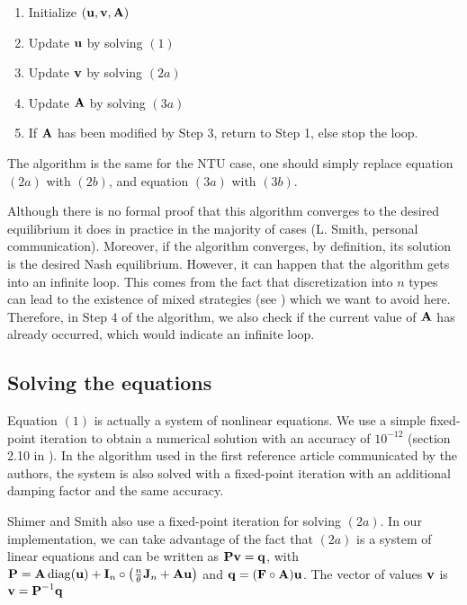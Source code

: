 \begin{enumerate}[start=0]
	\item Initialize $(\boldsymbol{\mathbf{u}},\boldsymbol{\mathbf{v}},\boldsymbol{\mathbf{A}})$
	\item Update $\boldsymbol{\mathbf{u}}$ by solving $(1)$
	\item Update $\boldsymbol{\mathbf{v}}$ by solving $(2a)$
	\item Update $\boldsymbol{\mathbf{A}}$ by solving $(3a)$
	\item If $\boldsymbol{\mathbf{A}}$ has been modified by Step 3, return to Step 1, else stop the loop.
\end{enumerate}

The algorithm is the same for the NTU case, one should simply replace equation $(2a)$ with $(2b)$, and equation $(3a)$ with $(3b)$.

Although there is no formal proof that this algorithm converges to the desired equilibrium it does in practice in the majority of cases (L. Smith, personal communication). Moreover, if the algorithm converges, by definition, its solution is the desired Nash equilibrium. However, it can happen that the algorithm gets into an infinite loop. This comes from the fact that discretization into $n$ types can lead to the existence of mixed strategies (see \citep{hagedorn_identifying_2017}) which we want to avoid here. Therefore, in Step 4 of the algorithm, we also check if the current value of $\boldsymbol{\mathbf{A}}$ has already occurred, which would indicate an infinite loop. 


\subsection*{Solving the equations}

Equation $(1)$ is actually a system of nonlinear equations. We use a simple fixed-point iteration to obtain a numerical solution with an accuracy of $10^{-12}$ (section 2.10 in \citep{atkinson_introduction_1989}). In the algorithm used in the first reference article \citep{shimer_assortative_2000} communicated by the authors, the system is also solved with a fixed-point iteration with an additional damping factor and the same accuracy.

Shimer and Smith \citep{shimer_assortative_2000} also use a fixed-point iteration for solving $(2a)$. In our implementation, we can take advantage of the fact that $(2a)$ is a system of linear equations and can be written as $\boldsymbol{\mathbf{P}} \boldsymbol{\mathbf{v}} = \boldsymbol{\mathbf{q}}$, with $\boldsymbol{\mathbf{P}} = \boldsymbol{\mathbf{A}} \operatorname{diag}(\boldsymbol{\mathbf{u}}) + \boldsymbol{\mathbf{I}}_n \circ \left(\frac{n}{\theta} \boldsymbol{\mathbf{J}}_n + \boldsymbol{\mathbf{A}} \boldsymbol{\mathbf{u}}\right)$ and $\boldsymbol{\mathbf{q}} = (\boldsymbol{\mathbf{F}} \circ \boldsymbol{\mathbf{A}}) \boldsymbol{\mathbf{u}}$. The vector of values $\boldsymbol{\mathbf{v}}$ is $ \boldsymbol{\mathbf{v}} = \boldsymbol{\mathbf{P}}^{-1} \boldsymbol{\mathbf{q}} $

